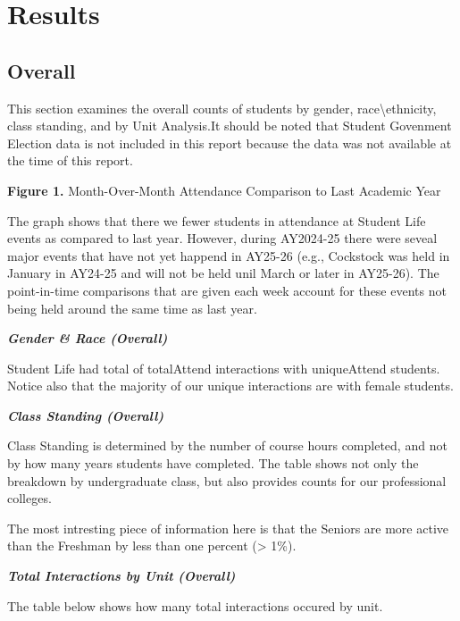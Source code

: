 \documentclass[
]{article}
\begin{document}
\section{Results}\label{results}

\subsection{Overall}\label{overall}

\noindent This section examines the overall counts of students by
gender, race\textbackslash ethnicity, class standing, and by Unit
Analysis.It should be noted that Student Govenment Election data is not
included in this report because the data was not available at the time
of this report.

\textbf{Figure 1.} Month-Over-Month Attendance Comparison to Last
Academic Year

The graph shows that there we fewer students in attendance at Student
Life events as compared to last year. However, during AY2024-25 there
were seveal major events that have not yet happend in AY25-26 (e.g.,
Cockstock was held in January in AY24-25 and will not be held unil March
or later in AY25-26). The point-in-time comparisons that are given each
week account for these events not being held around the same time as
last year.

\raggedright

\textsf{\textbf{\textit{Gender \& Race (Overall)}}}

\noindent Student Life had total of totalAttend interactions with
uniqueAttend students. Notice also that the majority of our unique
interactions are with female students.

\raggedright

\textsf{\textbf{\textit{Class Standing (Overall)}}}

\noindent Class Standing is determined by the number of course hours
completed, and not by how many years students have completed. The table
shows not only the breakdown by undergraduate class, but also provides
counts for our professional colleges.

The most intresting piece of information here is that the Seniors are
more active than the Freshman by less than one percent (\textgreater{}
1\%).

\newpage
\raggedright

\textsf{\textbf{\textit{Total Interactions by Unit (Overall)}}}

\noindent The table below shows how many total interactions occured by
unit.
\end{document}
